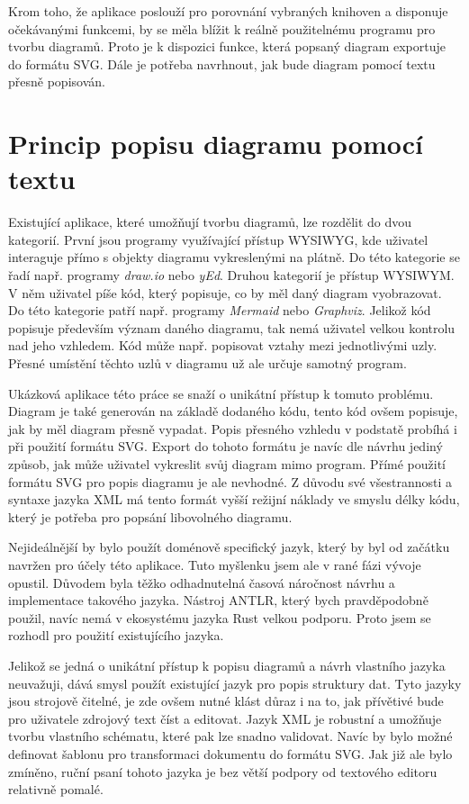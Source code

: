 \documentclass[FM,DP]{tulthesis}
\begin{document}
	Krom toho, že aplikace poslouží pro porovnání vybraných knihoven a disponuje očekávanými funkcemi, by se měla blížit k reálně použitelnému programu pro tvorbu diagramů. Proto je k dispozici funkce, která popsaný diagram exportuje do formátu SVG. Dále je potřeba navrhnout, jak bude diagram pomocí textu přesně popisován.
	
	\section{Princip popisu diagramu pomocí textu}
	
	Existující aplikace, které umožňují tvorbu diagramů, lze rozdělit do dvou kategorií. První jsou programy využívající přístup WYSIWYG, kde uživatel interaguje přímo s objekty diagramu vykreslenými na plátně. Do této kategorie se řadí např. programy \textit{draw.io} nebo \textit{yEd}. Druhou kategorií je přístup WYSIWYM. V něm uživatel píše kód, který popisuje, co by měl daný diagram vyobrazovat. Do této kategorie patří např. programy \textit{Mermaid} nebo \textit{Graphviz}. Jelikož kód popisuje především význam daného diagramu, tak nemá uživatel velkou kontrolu nad jeho vzhledem. Kód může např. popisovat vztahy mezi jednotlivými uzly. Přesné umístění těchto uzlů v diagramu už ale určuje samotný program.
	
	Ukázková aplikace této práce se snaží o unikátní přístup k tomuto problému. Diagram je také generován na základě dodaného kódu, tento kód ovšem popisuje, jak by měl diagram přesně vypadat. Popis přesného vzhledu v podstatě probíhá i při použití formátu SVG. Export do tohoto formátu je navíc dle návrhu jediný způsob, jak může uživatel vykreslit svůj diagram mimo  program. Přímé použití formátu SVG pro popis diagramu je ale nevhodné. Z důvodu své všestrannosti a syntaxe jazyka XML má tento formát vyšší  režijní náklady ve smyslu délky kódu, který je potřeba pro popsání libovolného diagramu.
	
	Nejideálnější by bylo použít doménově specifický jazyk, který by byl od začátku navržen pro účely této aplikace. Tuto myšlenku jsem ale v rané fázi vývoje opustil. Důvodem byla těžko odhadnutelná časová náročnost návrhu a implementace takového jazyka. Nástroj ANTLR, který bych pravděpodobně použil, navíc nemá v \mbox{ekosystému} jazyka Rust velkou podporu. Proto jsem se rozhodl pro použití existujícího jazyka.
	
	Jelikož se jedná o unikátní přístup k popisu diagramů a návrh vlastního jazyka neuvažuji, dává smysl použít existující jazyk pro popis struktury dat. Tyto jazyky jsou strojově čitelné, je zde ovšem nutné klást důraz i na to, jak přívětivé bude pro uživatele zdrojový text číst a editovat. Jazyk XML je robustní a umožňuje tvorbu vlastního schématu, které pak lze snadno validovat. Navíc by bylo možné definovat šablonu pro transformaci dokumentu do formátu SVG. Jak již ale bylo zmíněno, ruční psaní tohoto jazyka je bez větší podpory od textového editoru relativně pomalé.
	
\end{document}
